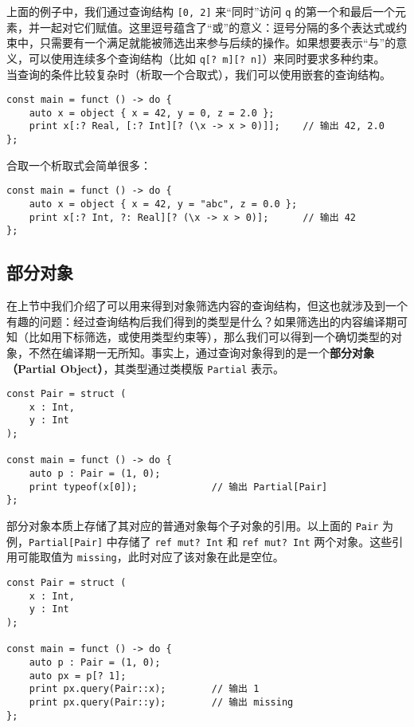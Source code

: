上面的例子中，我们通过查询结构 \lstinline![0, 2]! 来“同时”访问 \lstinline!q! 的第一个和最后一个元素，并一起对它们赋值。这里逗号蕴含了“或”的意义：逗号分隔的多个表达式或约束中，只需要有一个满足就能被筛选出来参与后续的操作。如果想要表示“与”的意义，可以使用连续多个查询结构（比如 \lstinline!q[? m][? n]!）来同时要求多种约束。 \\

当查询的条件比较复杂时（析取一个合取式），我们可以使用嵌套的查询结构。

\begin{lstlisting}
const main = funct () -> do {
	auto x = object { x = 42, y = 0, z = 2.0 };
	print x[:? Real, [:? Int][? (\x -> x > 0)]];	// 输出 42, 2.0
};
\end{lstlisting}

合取一个析取式会简单很多：

\begin{lstlisting}
const main = funct () -> do {
	auto x = object { x = 42, y = "abc", z = 0.0 };
	print x[:? Int, ?: Real][? (\x -> x > 0)];		// 输出 42
};
\end{lstlisting}


\subsection{部分对象}

在上节中我们介绍了可以用来得到对象筛选内容的查询结构，但这也就涉及到一个有趣的问题：经过查询结构后我们得到的类型是什么？如果筛选出的内容编译期可知（比如用下标筛选，或使用类型约束等），那么我们可以得到一个确切类型的对象，不然在编译期一无所知。事实上，通过查询对象得到的是一个\textbf{部分对象（Partial Object）}，其类型通过类模版 \lstinline!Partial! 表示。

\begin{lstlisting}
const Pair = struct (
	x : Int,
	y : Int
);

const main = funct () -> do {
	auto p : Pair = (1, 0);
	print typeof(x[0]);				// 输出 Partial[Pair]
};
\end{lstlisting}

部分对象本质上存储了其对应的普通对象每个子对象的引用。以上面的 \lstinline!Pair! 为例，\lstinline!Partial[Pair]! 中存储了 \lstinline!ref mut? Int! 和 \lstinline!ref mut? Int! 两个对象。这些引用可能取值为 \lstinline!missing!，此时对应了该对象在此是空位。

\begin{lstlisting}
const Pair = struct (
	x : Int,
	y : Int
);

const main = funct () -> do {
	auto p : Pair = (1, 0);
	auto px = p[? 1];
	print px.query(Pair::x);		// 输出 1
	print px.query(Pair::y);		// 输出 missing
};
\end{lstlisting}

